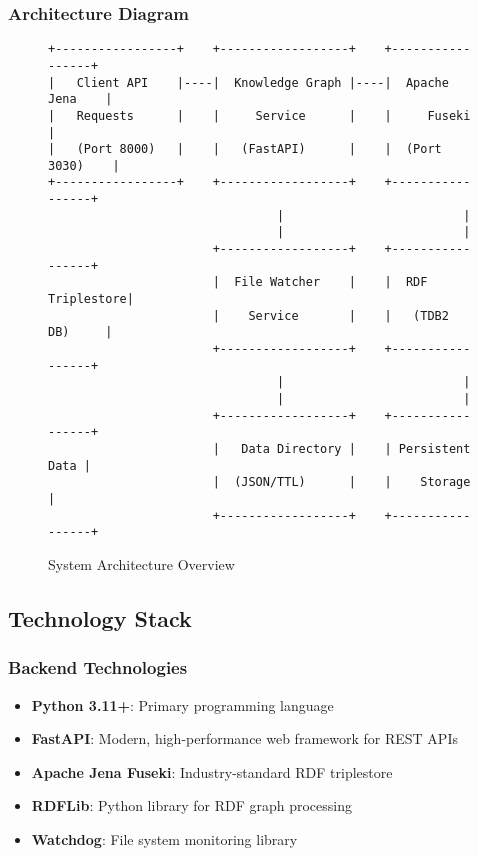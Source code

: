 \documentclass[12pt,a4paper]{article}
\begin{document}
\subsubsection{Architecture Diagram}

\begin{figure}[H]
\centering
\begin{verbatim}
+-----------------+    +------------------+    +-----------------+
|   Client API    |----|  Knowledge Graph |----|  Apache Jena    |
|   Requests      |    |     Service      |    |     Fuseki      |
|   (Port 8000)   |    |   (FastAPI)      |    |  (Port 3030)    |
+-----------------+    +------------------+    +-----------------+
                                |                         |
                                |                         |
                       +------------------+    +-----------------+
                       |  File Watcher    |    |  RDF Triplestore|
                       |    Service       |    |   (TDB2 DB)     |
                       +------------------+    +-----------------+
                                |                         |
                                |                         |
                       +------------------+    +-----------------+
                       |   Data Directory |    | Persistent Data |
                       |  (JSON/TTL)      |    |    Storage      |
                       +------------------+    +-----------------+
\end{verbatim}
\caption{System Architecture Overview}
\end{figure}

\subsection{Technology Stack}

\subsubsection{Backend Technologies}
\begin{itemize}
    \item \textbf{Python 3.11+}: Primary programming language
    \item \textbf{FastAPI}: Modern, high-performance web framework for REST APIs
    \item \textbf{Apache Jena Fuseki}: Industry-standard RDF triplestore
    \item \textbf{RDFLib}: Python library for RDF graph processing
    \item \textbf{Watchdog}: File system monitoring library
\end{itemize}
\end{document}
